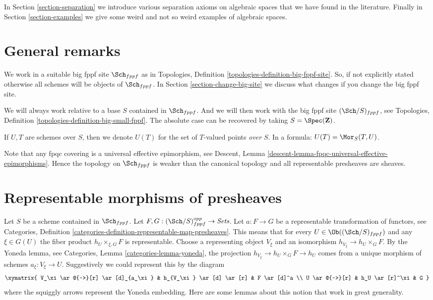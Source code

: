 \medskip\noindent
In Section \ref{section-separation} we introduce various separation
axioms on algebraic spaces that we have found in the literature.
Finally in Section \ref{section-examples}
we give some weird and not so weird examples of algebraic spaces.






\section{General remarks}
\label{section-general}

\noindent
We work in a suitable big fppf site $\Sch_{fppf}$
as in Topologies, Definition \ref{topologies-definition-big-fppf-site}.
So, if not explicitly stated otherwise all schemes will be objects
of $\Sch_{fppf}$.
In Section \ref{section-change-big-site} we discuss what
changes if you change the big fppf site.

\medskip\noindent
We will always work relative to a base $S$ contained in $\Sch_{fppf}$.
And we will then work with the big fppf site $(\Sch/S)_{fppf}$,
see Topologies, Definition \ref{topologies-definition-big-small-fppf}.
The absolute case can be recovered by taking
$S = \Spec(\mathbf{Z})$.

\medskip\noindent
If $U, T$ are schemes over $S$, then we denote
$U(T)$ for the set of $T$-valued points {\it over} $S$.
In a formula: $U(T) = \Mor_S(T, U)$.

\medskip\noindent
Note that any fpqc covering is a universal effective epimorphism, see
Descent, Lemma \ref{descent-lemma-fpqc-universal-effective-epimorphisms}.
Hence the topology on $\Sch_{fppf}$
is weaker than the canonical topology and all representable presheaves
are sheaves.







\section{Representable morphisms of presheaves}
\label{section-representable}

\noindent
Let $S$ be a scheme contained in $\Sch_{fppf}$.
Let $F, G : (\Sch/S)_{fppf}^{opp} \to \textit{Sets}$.
Let $a : F \to G$ be a representable transformation of functors, see
Categories,
Definition \ref{categories-definition-representable-map-presheaves}.
This means that for every
$U \in \Ob((\Sch/S)_{fppf})$ and
any $\xi \in G(U)$ the fiber product $h_U \times_{\xi, G} F$ is representable.
Choose a representing object $V_\xi$ and an isomorphism
$h_{V_\xi} \to h_U \times_G F$.
By the Yoneda lemma, see Categories, Lemma \ref{categories-lemma-yoneda},
the projection $h_{V_\xi} \to h_U \times_G F \to h_U$ comes from a unique
morphism of schemes $a_\xi : V_\xi \to U$.
Suggestively we could represent this by the diagram
$$
\xymatrix{
V_\xi \ar@{~>}[r] \ar[d]_{a_\xi} & h_{V_\xi} \ar[d] \ar[r] & F \ar[d]^a \\
U \ar@{~>}[r] & h_U \ar[r]^\xi & G
}
$$
where the squiggly arrows represent the Yoneda embedding.
Here are some lemmas about this notion that work in great generality.


